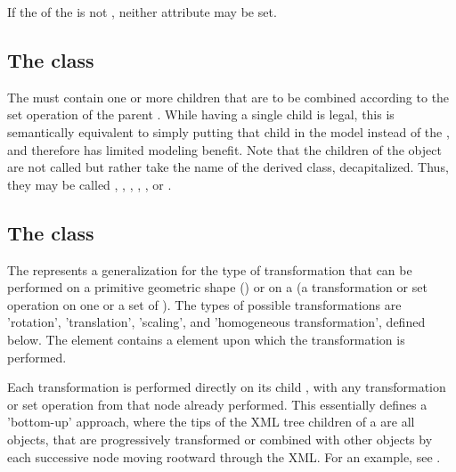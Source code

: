 If the  of the \CSGSetOperator is not , neither  attribute may be set.



\subsection{The  class}
\label{listofcsgnodes-class}
The \ListOfCSGNodes must contain one or more  children that are to be combined according to the set operation of the parent \CSGSetOperator.  While having a single child is legal, this is semantically equivalent to simply putting that child in the model instead of the \CSGSetOperator, and therefore has limited modeling benefit.  Note that the children of the \ListOfCSGNodes object are not called  but rather take the name of the derived class, decapitalized.  Thus, they may be called , , , , , or .


\subsection{The  class}
\label{csgtransformation-class}
The \CSGTransformation represents a generalization for the type of transformation that can be performed on a primitive geometric shape (\CSGPrimitive) or on a \CSGNode (a transformation or set operation on one or a set of \CSGPrimitives). The types of possible transformations are 'rotation', 'translation', 'scaling', and 'homogeneous transformation', defined below. The \CSGTransformation element contains a \CSGNode element upon which the transformation is performed.

Each transformation is performed directly on its child \CSGNode, with any transformation or set operation from that node already performed.  This essentially defines a 'bottom-up' approach, where the tips of the XML tree children of a \CSGObject are all \CSGPrimitive objects, that are progressively transformed or combined with other \CSGPrimitive objects by each successive node moving rootward through the XML.  For an example, see .

